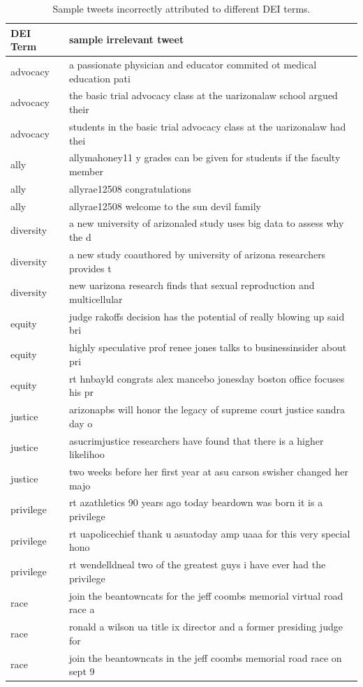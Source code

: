 \documentclass[
  12pt,
  man, donotrepeattitle]{apa6}
\begin{document}
\begingroup\fontsize{12}{14}\selectfont

\begin{longtable}[l]{ll}
\caption{\label{tab:Table2}Sample tweets incorrectly attributed to different DEI terms.}\\
\toprule
DEI Term & sample irrelevant tweet\\
\midrule
advocacy & a passionate physician and educator commited ot medical education pati\\
advocacy & the basic trial advocacy class at the uarizonalaw school argued their\\
advocacy & students in the basic trial advocacy class at the uarizonalaw had thei\\
ally & allymahoney11 y grades can be given for students if the faculty member\\
ally & allyrae12508 congratulations\\
ally & allyrae12508 welcome to the sun devil family\\
diversity & a new university of arizonaled study uses big data to assess why the d\\
diversity & a new study coauthored by university of arizona researchers provides t\\
diversity & new uarizona research finds that sexual reproduction and multicellular\\
equity & judge rakoffs decision has the potential of really blowing up said bri\\
equity & highly speculative prof renee jones talks to businessinsider about pri\\
equity & rt hnbayld congrats alex mancebo jonesday boston office focuses his pr\\
justice & arizonapbs will honor the legacy of supreme court justice sandra day o\\
justice & asucrimjustice researchers have found that there is a higher likelihoo\\
justice & two weeks before her first year at asu carson swisher changed her majo\\
privilege & rt azathletics 90 years ago today beardown was born it is a privilege\\
privilege & rt uapolicechief thank u asuatoday amp uaaa for this very special hono\\
privilege & rt wendelldneal two of the greatest guys i have ever had the privilege\\
race & join the beantowncats for the jeff coombs memorial virtual road race a\\
race & ronald a wilson ua title ix director and a former presiding judge for\\
race & join the beantowncats in the jeff coombs memorial road race on sept 9\\
\bottomrule
\end{longtable}
\endgroup{}


\clearpage
\renewcommand{\listfigurename}{Figure captions}
\end{document}
